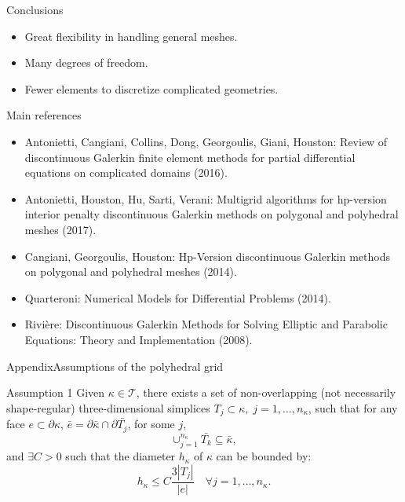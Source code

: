 \documentclass{beamer}
\begin{document}
\begin{frame}{Conclusions}
	\begin{itemize}
		\item Great flexibility in handling general meshes.
		\item Many degrees of freedom.
		\item Fewer elements to discretize complicated geometries.
	\end{itemize}
\end{frame}
\begin{frame}{Main references}
\begin{itemize}
	\item Antonietti, Cangiani, Collins, Dong, Georgoulis, Giani, Houston: 
	Review of discontinuous Galerkin finite element methods for partial 
	differential equations on complicated domains (2016).
	
	\item Antonietti, Houston, Hu, Sarti, Verani: Multigrid
	algorithms for hp-version interior penalty discontinuous Galerkin methods
	on polygonal and polyhedral meshes (2017).
	
	\item Cangiani, Georgoulis, Houston: Hp-Version discontinuous
	Galerkin methods on polygonal and polyhedral meshes (2014).
	
	\item Quarteroni: Numerical Models for Differential Problems (2014).
	
	\item Rivière: Discontinuous Galerkin Methods for Solving Elliptic and
		Parabolic Equations: Theory and Implementation (2008).
\end{itemize}
\end{frame}
\appendix
\begin{frame}[label=supplemental]{Appendix}{Assumptions of the polyhedral
grid}
	\begin{block}{Assumption 1}
		Given $\kappa \in \mathcal{T}$, there exists a set of non-overlapping
		(not
		necessarily shape-regular) three-dimensional simplices $T_j \subset
		\kappa,
		\; j = 1,\dots, n_\kappa$, such that for any face $e \subset \partial
		\kappa$, $\bar{e} = \partial \bar{\kappa} \cap \partial \bar{T_j}$, for
		some $j$,
		\begin{equation*}
		\cup_{j = 1}^{n_\kappa} \bar{T_k} \subseteq \bar{\kappa},
		\end{equation*}
		and  $\exists C > 0$ such that the diameter $h_\kappa$ of $\kappa$ can
		be bounded by:
		\begin{equation*}
		h_\kappa \leq C \frac{3 |T_j|}{|e|} \quad \forall j = 1,\dots,n_\kappa.
		\end{equation*}
	\end{block}
\end{frame}
\end{document}
